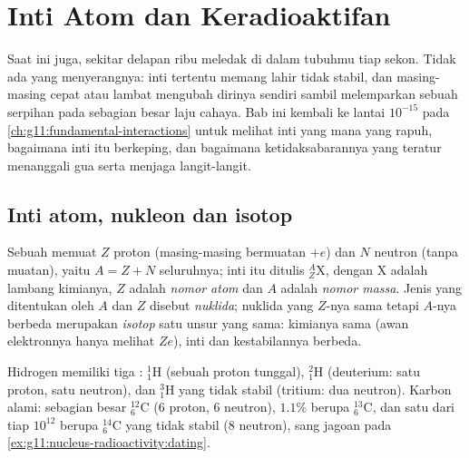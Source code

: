 \chapter{Inti Atom dan Keradioaktifan}\label{ch:g11:nucleus-radioactivity}

Saat ini juga, sekitar delapan ribu  meledak di dalam tubuhmu tiap
sekon. Tidak ada yang menyerangnya: inti tertentu memang lahir tidak stabil,
dan masing-masing cepat atau lambat mengubah dirinya sendiri sambil
melemparkan sebuah serpihan pada sebagian besar laju cahaya. Bab ini kembali
ke lantai $10^{-15}$  pada
\cref{ch:g11:fundamental-interactions} untuk melihat inti yang mana yang
rapuh, bagaimana inti itu berkeping, dan bagaimana ketidaksabarannya yang
teratur menanggali gua serta menjaga langit-langit.

\section{Inti atom, nukleon dan isotop}

\begin{definition}\label{def:g11:nucleus-radioactivity:notation}
Sebuah  memuat $Z$ proton (masing-masing bermuatan $+e$) dan $N$
neutron (tanpa muatan), yaitu $A = Z + N$  seluruhnya; inti itu
ditulis ${}^{A}_{Z}\mathrm{X}$, dengan $\mathrm X$ adalah lambang kimianya,
$Z$ adalah \emph{nomor atom} dan $A$ adalah \emph{nomor
massa}. Jenis yang ditentukan oleh $A$ dan $Z$ disebut
\emph{nuklida}; nuklida yang $Z$-nya sama tetapi $A$-nya
berbeda merupakan \emph{isotop} satu unsur yang sama: kimianya
sama (awan elektronnya hanya melihat $Ze$), inti dan kestabilannya berbeda.
\end{definition}

\begin{example}\label{ex:g11:nucleus-radioactivity:hc}
Hidrogen memiliki tiga : ${}^{1}_{1}\mathrm{H}$ (sebuah proton
tunggal), ${}^{2}_{1}\mathrm{H}$ (deuterium: satu proton, satu neutron), dan
${}^{3}_{1}\mathrm{H}$ yang tidak stabil (tritium: dua neutron). Karbon
alami: sebagian besar ${}^{12}_{6}\mathrm{C}$ ($6$ proton, $6$ neutron),
$1.1\%$ berupa ${}^{13}_{6}\mathrm{C}$, dan satu  dari tiap $10^{12}$
berupa ${}^{14}_{6}\mathrm{C}$ yang tidak stabil ($8$ neutron), sang jagoan
pada \cref{ex:g11:nucleus-radioactivity:dating}.
\end{example}

